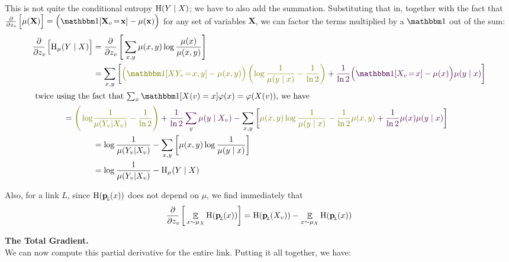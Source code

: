 \documentclass{article}
\begin{document}
	This is not quite the conditional entropy $\mathrm{H}(Y\mid X)$; we have to also add the summation. Substituting that in, together with the fact that $\pz{\mu(\mathbf X)} = \Big(\mathbbm1[\mathbf X_v \!=\! \mathbf x] - \mu(\mathbf x)\Big)$ for any set of variables $\mathbf X$, we can factor the terms multiplied by a $\mathbbm1$ out of the sum:
	\begin{align*}
		\pz{\H_\mu(Y \mid X)} &= \pz{\sum_{x,y}\mu(x,y) \log \frac{\mu(x)}{\mu(x,y)}} \\
			&= \sum_{x,y} \left[ {\color{t1}\Big(\mathbbm1[XY_v \!=\! x,y] - \mu(x,y)\Big)\left(\log \frac{1}{\mu(y \mid x)} - \frac{1}{\ln 2}\right)} + {\color{t2}\frac{1}{\ln 2} \Big(\mathbbm1[X_v \!=\! x] - \mu(x)\Big) \mu(y \mid x)} \right] \\
\intertext{
	twice using the fact that $\sum_x \mathbbm1[X(v) = x]\varphi(x) = \varphi(X(v))$, we have
}
			= \color{t1}\Bigg(\log&{\color{t1} \frac{1}{\mu(Y_v | X_v)} - \frac{1}{\ln 2}\Bigg)}
			 +{ \color{t2}\frac{1}{\ln 2} \sum_{y} \mu(y \mid X_v)} - \sum_{x,y} \left[ {\color{t1}\mu(x,y) \log\frac{1}{\mu(y\mid x)} -\frac{1}{\ln2} \mu(x,y)} + {\color{t2}\frac{1}{\ln2} \mu(x)\mu(y\mid x)} \right] \\
			&= \log \frac{1}{\mu(Y_v | X_v)} - \sum_{x,y} \left[\mu(x,y) \log\frac{1}{\mu(y\mid x)} \right] \\
			&= \log \frac{1}{\mu(Y_v | X_v)} - \H_\mu(Y \mid X)
	\end{align*}
	
	Also, for a link $L$, since $\mathrm{H}(\mathbf p_{\!_{L}\!}(x))$ does not depend on $\mu$, we find immediately that 
	\[\pz{ \E_{x \sim \mu_X} \H(\bp(x)) }  = \H(\bp(X_v)) - \E_{x \sim \mu_X} \H(\bp(x))  \] 
	\endgroup
	
	\textbf{The Total Gradient.}\\
	We can now compute this partial derivative for the entire link. Putting it all together, we have:
	
\end{document}
